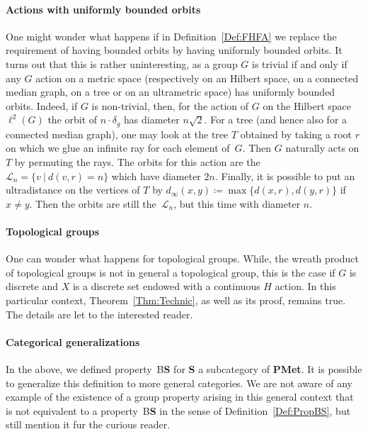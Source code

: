 \documentclass[a4paper]{article}
\theoremstyle{definition}
\newtheorem{rem}[lem]{Remark}
\newcommand*{\category}[1]{\textbf{#1}}
\newcommand*{\PMet}{\category{PMet}}
\newcommand*{\CatS}{\category{S}}
\newcommand*{\BS}{B\textbf{S}}
\newcommand{\setst}[2]{\{#1\ |\ #2\}}
\begin{document}
\paragraph{Actions with uniformly bounded orbits}
One might wonder what happens if in Definition~\ref{Def:FHFA} we replace the requirement of having bounded orbits by having uniformly bounded orbits.
It turns out that this is rather uninteresting, as a group $G$ is trivial if and only if any $G$ action on a metric space (respectively on an Hilbert space, on a connected median graph, on a tree or on an ultrametric space) has uniformly bounded orbits.
Indeed, if $G$ is non-trivial, then, for the action of $G$ on the Hilbert space $\ell^2(G)$ the orbit of $n\cdot \delta_g$ has diameter $n\sqrt2$.
For a tree (and hence also for a connected median graph), one may look at the tree $T$ obtained by taking a root $r$ on which we glue an infinite ray for each element of~$G$.
Then $G$ naturally acts on $T$ by permuting the rays.
The orbits for this action are the $\mathcal L_n=\setst{v}{d(v,r)=n}$ which have diameter $2n$.
Finally, it is possible to put an ultradistance on the vertices of $T$ by  $d_\infty(x,y)\coloneqq\max\{d(x,r),d(y,r)\}$ if $x\neq y$.
Then the orbits are still the~$\mathcal L_n$, but this time with diameter $n$.
%
%
%
\paragraph{Topological groups}
One can wonder what happens for topological groups. While, the wreath product of topological groups is not in general a topological group, this is the case if $G$ is discrete and $X$ is a discrete set endowed with a continuous $H$ action.
In this particular context, Theorem~\ref{Thm:Technic}, as well as its proof, remains true.
The details are let to the interested reader.
%
%
%
\paragraph{Categorical generalizations}
In the above, we defined property~\BS{} for \CatS{} a subcategory of \PMet.
It is possible to generalize this definition to more general categories.
We are not aware of any example of the existence of a group property arising in this general context that is not equivalent to a property~\BS{} in the sense of Definition~\ref{Def:PropBS}, but still mention it fur the curious reader.
\end{document}

